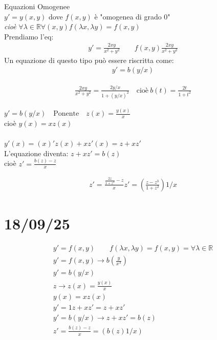 \documentclass[a4paper, oneside]{article}
\begin{document}
\begin{lemma}
    Equazioni Omogenee
    \\$y' = y(x,y)$ dove $f(x,y)$ è "omogenea di grado 0"
    \\\emph{cioè} $\forall \lambda \in \mathbb{R} \forall(x,y) f(\lambda x, \lambda y) = f(x,y)$
    \\Prendiamo l'eq:
\begin{align}
    y' = \frac{2xy}{x^2+y^2} \qquad f(x,y) \frac{2xy}{x^2+y^2}
\end{align}
Un equazione di questo tipo può essere riscritta come:
\begin{align}
    y' = b(y/x)
\end{align}
\begin{example}
    \begin{align}
        \frac{2xy}{x^2+y^2} = \frac{2y/x}{1+(y/x)^2} \quad\text{cioè}\ b(t) = \frac{2t}{1+t^2}
    \end{align}
\end{example}

\begin{proposition}
$ y' = b(y/x)\quad \text{Ponente} \quad z(x) = \frac{y(x)}{x} $   
\\cioè $y(x) = x z(x)$ 
\\\\ $y'(x) = (x)' z(x)+x z'(x)=z+xz'$
\\L'equazione diventa: $z+xz' = b(z)$
\\cioè $z' = \frac{b(z)-z}{x}$
\end{proposition}

\begin{example}
    \begin{align}
        z' = \frac{\frac{2z}{1+z^2}-z}{x}
        z' = (\frac{z-z^3}{1+z^2})1/x
    \end{align}
\end{example}
\end{lemma}


\section{18/09/25}

\begin{gather*}
    y' = f(x,y) \qquad f(\lambda x, \lambda y) = f(x,y) = \forall \lambda \in \mathbb{R}\\
    y' = f(x,y) \to b(\frac{y}{x^3})\\
    y' = b(y/x)\\
    z \to z(x) = \frac{y(x)}{x}\\
    y(x) = x z(x)\\
    y' = 1 z + x z' = z+ xz'\\
    y' = b(y/x) \to z+xz' = b(z)\\
    z' = \frac{b(z) - z}{x} = (b(z) 1/x)
\end{gather*}
\end{document}
